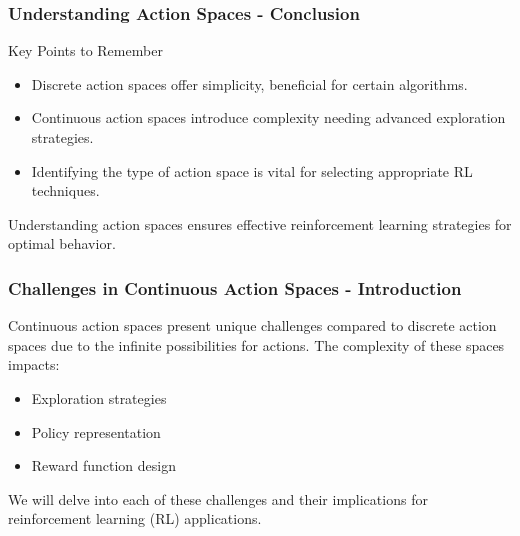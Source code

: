 \documentclass[aspectratio=169]{beamer}
\begin{document}
\begin{frame}[fragile]
    \frametitle{Understanding Action Spaces - Conclusion}
    \begin{block}{Key Points to Remember}
        \begin{itemize}
            \item Discrete action spaces offer simplicity, beneficial for certain algorithms.
            \item Continuous action spaces introduce complexity needing advanced exploration strategies.
            \item Identifying the type of action space is vital for selecting appropriate RL techniques.
        \end{itemize}
    \end{block}
    Understanding action spaces ensures effective reinforcement learning strategies for optimal behavior.
\end{frame}

\begin{frame}[fragile]
    \frametitle{Challenges in Continuous Action Spaces - Introduction}
    Continuous action spaces present unique challenges compared to discrete action spaces due to the infinite possibilities for actions. The complexity of these spaces impacts:
    \begin{itemize}
        \item Exploration strategies
        \item Policy representation
        \item Reward function design
    \end{itemize}
    We will delve into each of these challenges and their implications for reinforcement learning (RL) applications.
\end{frame}
\end{document}
